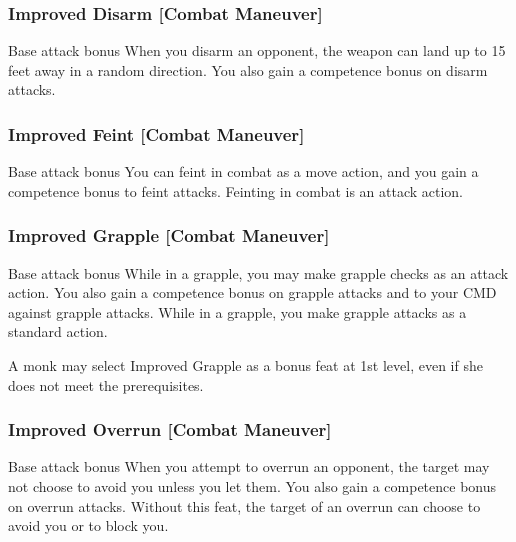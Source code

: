 \subsubsection{Improved Disarm [Combat Maneuver]}
 Base attack bonus 
 When you disarm an opponent, the weapon can land up to 15 feet away in a random direction. You also gain a  competence bonus on disarm attacks.

\subsubsection{Improved Feint [Combat Maneuver]}
 Base attack bonus 
 You can feint in combat as a move action, and you gain a  competence bonus to feint attacks.
 Feinting in combat is an attack action.

\subsubsection{Improved Grapple [Combat Maneuver]}
 Base attack bonus 
 While in a grapple, you may make grapple checks as an attack action. You also gain a  competence bonus on grapple attacks and to your CMD against grapple attacks.
 While in a grapple, you make grapple attacks as a standard action.
\par A monk may select Improved Grapple as a bonus feat at 1st level, even if she does not meet the prerequisites.

\subsubsection{Improved Overrun [Combat Maneuver]}
 Base attack bonus 
 When you attempt to overrun an opponent, the target may not choose to avoid you unless you let them. You also gain a  competence bonus on overrun attacks.
 Without this feat, the target of an overrun can choose to avoid you or to block you.

\begin{comment}
\subsubsection{Improved Sunder [Combat Maneuver]}
\parhead{Prerequisites} Base attack bonus \plus4
\parhead{Benefit} When you strike at an object held or carried by an opponent (such as a weapon or shield), you ignore half the hardness of the sundered item. You also gain a \plus2 competence bonus on sunder attacks.
\end{comment}

